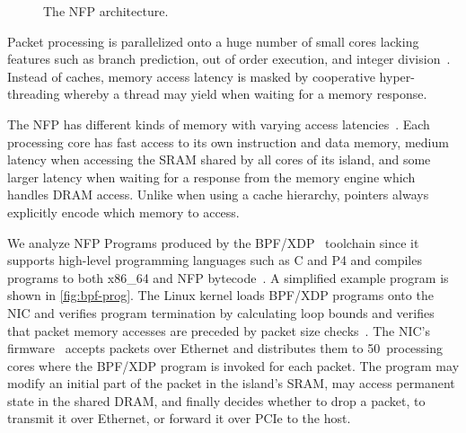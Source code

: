 \documentclass[10pt,letterpaper,sigconf,anonymous,nonacm,screen]{acmart}
\newcommand{\afblock}[1]{\noindent{\textbf{#1.}}}
\begin{document}
\begin{figure}[t]
	\caption{The \acl{NFP} architecture.}
	\label{fig:nfp-architecture}
\end{figure}

\afblock{Many Simple Cores}
Packet processing is parallelized onto a huge number of small cores lacking features such as branch prediction, out of order execution, and integer division~\cite{reference-manual}.
Instead of caches, memory access latency is masked by cooperative hyper-threading whereby a thread may yield when waiting for a memory response.

\afblock{An Explicit Memory Hierarchy}
The \ac{NFP} has different kinds of memory with varying access latencies~\cite{joy-of-micro-c}.
Each processing core has fast access to its own instruction and data memory, medium latency when accessing the SRAM shared by all cores of its island, and some larger latency when waiting for a response from the memory engine which handles DRAM access.
Unlike when using a cache hierarchy, pointers always explicitly encode which memory to access.

\afblock{BPF/XDP on \acs{NFP}}
We analyze NFP Programs produced by the BPF/XDP~\cite{XDP,XDP-offload} toolchain since it supports high-level programming languages such as C and P4 and compiles programs to both x86\_64 and \ac{NFP} bytecode~\cite{XDP-offload,nfp-drv-kmods}.
A simplified example program is shown in \ref{fig:bpf-prog}.
The Linux kernel loads BPF/XDP programs onto the NIC and verifies program termination by calculating loop bounds and verifies that packet memory accesses are preceded by packet size checks~\cite{XDP}.
The NIC's firmware~\cite{nic-firmware} accepts packets over Ethernet and distributes them to 50~processing cores where the BPF/XDP program is invoked for each packet.
The program may modify an initial part of the packet in the island's SRAM, may access permanent state in the shared DRAM, and finally decides whether to drop a packet, to transmit it over Ethernet, or forward it over PCIe to the host.
\end{document}
